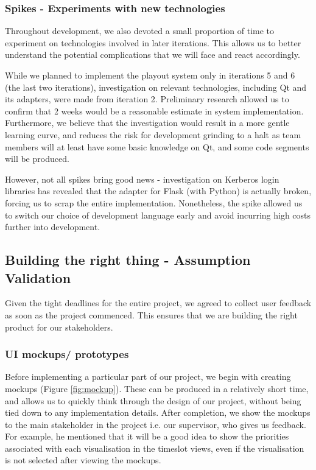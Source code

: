 ﻿\documentclass[a4paper, titlepage]{article}
\begin{document}
\subsubsection{Spikes - Experiments with new technologies}

Throughout development, we also devoted a small proportion of time to experiment on technologies involved in later iterations. This allows us to better understand the potential complications that we will face and react accordingly.

While we planned to implement the playout system only in iterations 5 and 6 (the last two iterations), investigation on relevant technologies, including Qt and its adapters, were made from iteration 2. Preliminary research allowed us to confirm that 2 weeks would be a reasonable estimate in system implementation. Furthermore, we believe that the investigation would result in a more gentle learning curve, and reduces the risk for development grinding to a halt as team members will at least have some basic knowledge on Qt, and some code segments will be produced.

However, not all spikes bring good news - investigation on Kerberos login libraries has revealed that the adapter for Flask (with Python) is actually broken, forcing us to scrap the entire implementation. Nonetheless, the spike allowed us to switch our choice of development language early and avoid incurring high costs further into development.

\subsection{Building the right thing - Assumption Validation} \label{sec:validation}

Given the tight deadlines for the entire project, we agreed to collect
user feedback as soon as the project commenced. This ensures that we are building the right product for our stakeholders.

\subsubsection{UI mockups/ prototypes} \label{sec:uimockup}

Before implementing a particular part of our project, we begin with creating mockups (Figure \ref{fig:mockup}). These can be produced in a relatively short time, and allows us to quickly think through the design of our project, without being tied down to any implementation details. After completion, we show the mockups to the main stakeholder in the project i.e. our supervisor, who gives us feedback. For example, he mentioned that it will be a good idea to show the priorities associated with each visualisation in the timeslot views, even if the visualisation is not selected after viewing the mockups.
\end{document}
